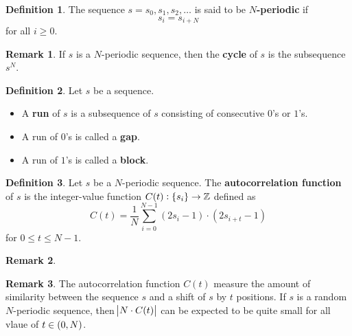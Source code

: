 \documentclass[12pt,openany]{book}
\theoremstyle{definition}
\newtheorem{definition}{Definition}[chapter]
\newtheorem{remark}{Remark}[chapter]
\newcommand{\Z}{\mathbb{Z}}
\begin{document}
\begin{tcolorbox}[colback=white,colframe=defcolor,arc=5pt,title={\color{white}\bf $N$-Periodic}]
	\begin{definition}
		The sequence $s=s_0,s_1,s_2,\dots$ is said to be \textbf{$N$-periodic} if \[
		s_i=s_{i+N}
		\] for all $i\geq 0$.
	\end{definition}
\end{tcolorbox}
\begin{remark}
	If $s$ is a $N$-periodic sequence, then the \textbf{cycle} of $s$ is the subsequence $s^N$.
\end{remark}
\vspace{12pt}
\begin{tcolorbox}[colback=white,colframe=defcolor,arc=5pt,title={\color{white}\bf Run - Gap / Block}]
	\begin{definition}
		Let $s$ be a sequence. \begin{itemize}
			\item A \textbf{run} of $s$ is a subsequence of $s$ consisting of consecutive $0$'s or $1$'s.
			\item A run of $0$'s is called a \textbf{gap}.
			\item A run of $1$'s is called a \textbf{block}.
		\end{itemize}
	\end{definition}
\end{tcolorbox}
\vspace{24pt}
\newpage
\begin{tcolorbox}[colback=white,colframe=defcolor,arc=5pt,title={\color{white}\bf Autocorrelation Function}]
	\begin{definition}
		Let $s$ be a $N$-periodic sequence. The \textbf{autocorrelation function} of $s$ is the integer-value function $C(t):\set{s_i}\to\Z$ defined as \[
		C(t) = \frac{1}{N}\sum_{i=0}^{N-1}(2s_i - 1) \cdot (2s_{i+t} - 1)
		\] for $0\leq t\leq N-1$.
	\end{definition}
\end{tcolorbox}
\begin{remark}
	
\end{remark}
\begin{remark}
	The autocorrelation function $C(t)$ measure the amount of similarity between the sequence $s$ and a shift of $s$ by $t$ positions. If $s$ is a random $N$-periodic sequence, then $\abs{N\cdot C(t)}$ can be expected to be quite small for all vlaue of $t\in\intoo{0,N}$. 
\end{remark}
\end{document}

